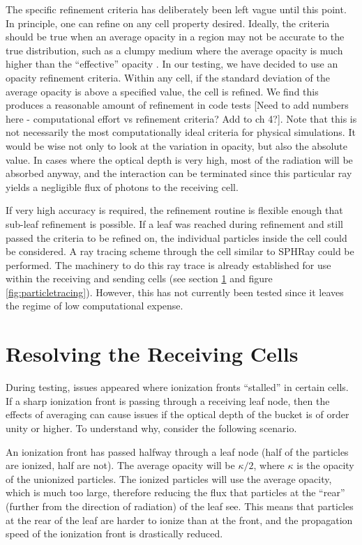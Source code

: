 The specific refinement criteria has deliberately been left vague until this point. In principle, one can refine on any cell property desired. Ideally, the criteria should be true when an average opacity in a region may not be accurate to the true distribution, such as a clumpy medium where the average opacity is much higher than the ``effective'' opacity \citep{hegmanKegel03,varosiDwek99}. In our testing, we have decided to use an opacity refinement criteria. Within any cell, if the standard deviation of the average opacity is above a specified value, the cell is refined. We find this produces a reasonable amount of refinement in code tests [Need to add numbers here - computational effort vs refinement criteria? Add to ch 4?]. Note that this is not necessarily the most computationally ideal criteria for physical simulations. It would be wise not only to look at the variation in opacity, but also the absolute value. In cases where the optical depth is very high, most of the radiation will be absorbed anyway, and the interaction can be terminated since this particular ray yields a negligible flux of photons to the receiving cell.

If very high accuracy is required, the refinement routine is flexible enough that sub-leaf refinement is possible. If a leaf was reached during refinement and still passed the criteria to be refined on, the individual particles inside the cell could be considered. A ray tracing scheme through the cell similar to SPHRay \citep{altayEt08} could be performed. The machinery to do this ray trace is already established for use within the receiving and sending cells (see section \ref{sec:resolvingleaves} and figure \ref{fig:particletracing}). However, this has not currently been tested since it leaves the regime of low computational expense.

\section{Resolving the Receiving Cells}
\label{sec:resolvingleaves}

During testing, issues appeared where ionization fronts ``stalled'' in certain cells. If a sharp ionization front is passing through a receiving leaf node, then the effects of averaging can cause issues if the optical depth of the bucket is of order unity or higher. To understand why, consider the following scenario.

An ionization front has passed halfway through a leaf node (half of the particles are ionized, half are not). The average opacity will be $\kappa/2$, where $\kappa$ is the opacity of the unionized particles. The ionized particles will use the average opacity, which is much too large, therefore reducing the flux that particles at the ``rear'' (further from the direction of radiation) of the leaf see. This means that particles at the rear of the leaf are harder to ionize than at the front, and the propagation speed of the ionization front is drastically reduced.

